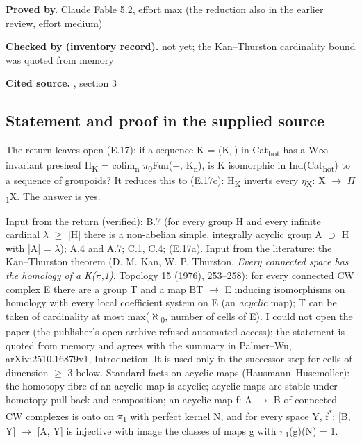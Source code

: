 \noindent\textbf{Proved by.} Claude Fable 5.2, effort max (the reduction also in the earlier review, effort medium)\par

\noindent\textbf{Checked by (inventory record).} not yet; the Kan--Thurston cardinality bound was quoted from memory\par\smallskip

\noindent\textbf{Cited source.} , section 3\par\medskip

\subsection*{Statement and proof in the supplied source}

The return leaves open (E.17): if a sequence K = (K\textsubscript{n}) in Cat\textsubscript{hot} has a W\ensuremath{\infty}-invariant presheaf H\textsubscript{K} = colim\textsubscript{n} \ensuremath{\pi}\textsubscript{0}Fun(\ensuremath{-}, K\textsubscript{n}), is K isomorphic in Ind(Cat\textsubscript{hot}) to a sequence of groupoids? It reduces this to (E.17c): H\textsubscript{K} inverts every \ensuremath{\eta}\textsubscript{X}: X \ensuremath{\to} \ensuremath{\Pi}\textsubscript{1}X. The answer is yes.

Input from the return (verified): B.7 (for every group H and every infinite cardinal \ensuremath{\lambda} \ensuremath{\geq} |H| there is a non-abelian simple, integrally acyclic group A \ensuremath{\supset} H with |A| = \ensuremath{\lambda}); A.4 and A.7; C.1, C.4; (E.17a). Input from the literature: the Kan--Thurston theorem (D. M. Kan, W. P. Thurston, \emph{Every connected space has the homology of a K(\ensuremath{\pi},1)}, Topology 15 (1976), 253--258): for every connected CW complex E there are a group T and a map BT \ensuremath{\to} E inducing isomorphisms on homology with every local coefficient system on E (an \emph{acyclic} map); T can be taken of cardinality at most max(\ensuremath{\aleph}\textsubscript{0}, number of cells of E). I could not open the paper (the publisher's open archive refused automated access); the statement is quoted from memory and agrees with the summary in Palmer--Wu, arXiv:2510.16879v1, Introduction. It is used only in the successor step for cells of dimension \ensuremath{\geq} 3 below. Standard facts on acyclic maps (Hausmann--Husemoller): the homotopy fibre of an acyclic map is acyclic; acyclic maps are stable under homotopy pull-back and composition; an acyclic map f: A \ensuremath{\to} B of connected CW complexes is onto on \ensuremath{\pi}\textsubscript{1} with perfect kernel N, and for every space Y, f\textsuperscript{*}: [B, Y] \ensuremath{\to} [A, Y] is injective with image the classes of maps g with \ensuremath{\pi}\textsubscript{1}(g)(N) = 1.

